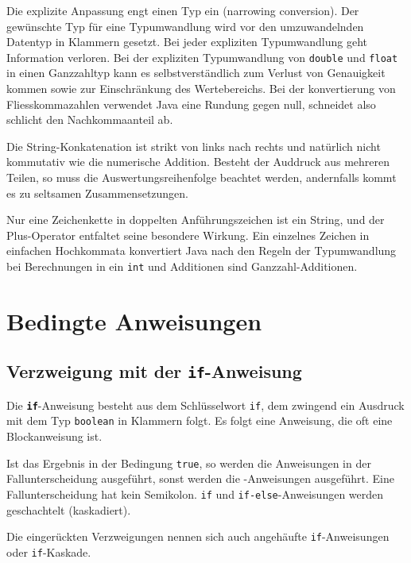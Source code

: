 \newline\newline
Die explizite Anpassung engt einen Typ ein (narrowing conversion). Der gewünschte Typ für eine Typumwandlung wird vor den umzuwandelnden Datentyp in Klammern gesetzt. Bei jeder expliziten Typumwandlung geht Information verloren.
\newline\newline
Bei der expliziten Typumwandlung von \texttt{double} und \texttt{float} in einen Ganzzahltyp kann es selbstverständlich zum Verlust von Genauigkeit kommen sowie zur Einschränkung des Wertebereichs. Bei der konvertierung von Fliesskommazahlen verwendet Java eine Rundung gegen null, schneidet also schlicht den Nachkommaanteil ab.

Die String-Konkatenation ist strikt von links nach rechts und natürlich nicht kommutativ wie die numerische Addition. Besteht der Auddruck aus mehreren Teilen, so muss die Auswertungsreihenfolge beachtet werden, andernfalls kommt es zu seltsamen Zusammensetzungen.

Nur eine Zeichenkette in doppelten Anführungszeichen ist ein String, und der Plus-Operator entfaltet seine besondere Wirkung. Ein einzelnes Zeichen in einfachen Hochkommata konvertiert Java nach den Regeln der Typumwandlung bei Berechnungen in ein \texttt{int} und Additionen sind Ganzzahl-Additionen.

\section{Bedingte Anweisungen}
\subsection{Verzweigung mit der \texttt{if}-Anweisung}
Die \textbf{\texttt{if}}-Anweisung besteht aus dem Schlüsselwort \texttt{if}, dem zwingend ein Ausdruck mit dem Typ \texttt{boolean} in Klammern folgt. Es folgt eine Anweisung, die oft eine Blockanweisung ist.

Ist das Ergebnis in der Bedingung \texttt{true}, so werden die Anweisungen in der Fallunterscheidung ausgeführt, sonst werden die -Anweisungen ausgeführt. Eine Fallunterscheidung hat kein Semikolon. \texttt{if} und \texttt{if-else}-Anweisungen werden geschachtelt (kaskadiert).

Die eingerückten Verzweigungen nennen sich auch angehäufte \texttt{if}-Anweisungen oder \texttt{if}-Kaskade.
